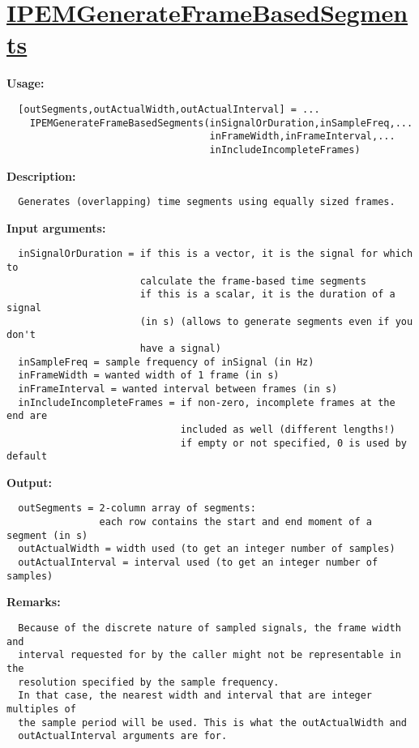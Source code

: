 \newpage
\section*{\hyperlink{Concepts:IPEMGenerateFrameBasedSegments}{IPEMGenerateFrameBasedSegments}}
\hypertarget{FuncRef:IPEMGenerateFrameBasedSegments}{}

\textbf{Usage:}
\begin{verbatim}  [outSegments,outActualWidth,outActualInterval] = ...
    IPEMGenerateFrameBasedSegments(inSignalOrDuration,inSampleFreq,...
                                   inFrameWidth,inFrameInterval,...
                                   inIncludeIncompleteFrames)

\end{verbatim}
\textbf{Description:}
\begin{verbatim}  Generates (overlapping) time segments using equally sized frames.

\end{verbatim}
\textbf{Input arguments:}
\begin{verbatim}  inSignalOrDuration = if this is a vector, it is the signal for which to
                       calculate the frame-based time segments
                       if this is a scalar, it is the duration of a signal
                       (in s) (allows to generate segments even if you don't
                       have a signal)
  inSampleFreq = sample frequency of inSignal (in Hz)
  inFrameWidth = wanted width of 1 frame (in s)
  inFrameInterval = wanted interval between frames (in s)
  inIncludeIncompleteFrames = if non-zero, incomplete frames at the end are
                              included as well (different lengths!)
                              if empty or not specified, 0 is used by default

\end{verbatim}
\textbf{Output:}
\begin{verbatim}  outSegments = 2-column array of segments:
                each row contains the start and end moment of a segment (in s)
  outActualWidth = width used (to get an integer number of samples)
  outActualInterval = interval used (to get an integer number of samples)

\end{verbatim}
\textbf{Remarks:}
\begin{verbatim}  Because of the discrete nature of sampled signals, the frame width and
  interval requested for by the caller might not be representable in the
  resolution specified by the sample frequency.
  In that case, the nearest width and interval that are integer multiples of
  the sample period will be used. This is what the outActualWidth and
  outActualInterval arguments are for.

\end{verbatim}
